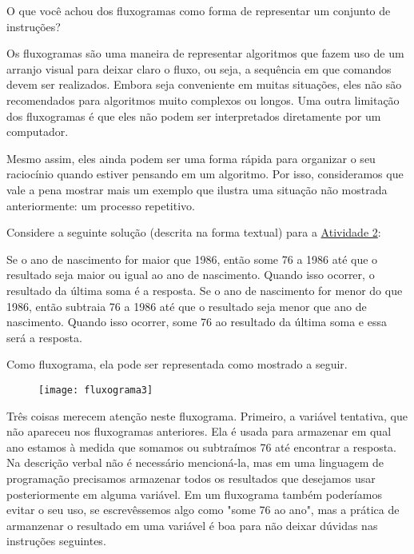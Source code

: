 \begin{reflection}
O que você achou dos fluxogramas como forma de representar um conjunto de instruções?
\end{reflection}

\label{comp-arr2}

Os fluxogramas são uma maneira de representar algoritmos que fazem uso de um arranjo visual para deixar claro o fluxo, ou seja, a sequência em que comandos devem ser realizados. Embora seja conveniente em muitas situações, eles não são recomendados para algoritmos muito complexos ou longos. Uma outra limitação dos fluxogramas é que eles não podem ser interpretados diretamente por um computador.

Mesmo assim, eles ainda podem ser uma forma rápida para organizar o seu raciocínio quando estiver pensando em um algoritmo. Por isso, consideramos que vale a pena mostrar mais um exemplo que ilustra uma situação não mostrada anteriormente: um processo repetitivo.

Considere a seguinte solução (descrita na forma textual) para a \hyperref[comp-task2]{Atividade 2}:

Se o ano de nascimento for maior que 1986, então some 76 a 1986 até que o resultado seja maior ou igual ao ano de nascimento. Quando isso ocorrer, o resultado da última soma é a resposta.
Se o ano de nascimento for menor do que 1986, então subtraia 76 a 1986 até que o resultado seja menor que ano de nascimento. Quando isso ocorrer, some 76 ao resultado da última soma e essa será a resposta.

Como fluxograma, ela pode ser representada como mostrado a seguir.

\begin{figure}[H]
\centering
\texttt{[image: fluxograma3]}
\end{figure}

Três coisas merecem atenção neste fluxograma.
Primeiro, a variável tentativa, que não apareceu nos fluxogramas anteriores. Ela é usada para armazenar em qual ano estamos à medida que somamos ou subtraímos 76 até encontrar a resposta. Na descrição verbal não é necessário mencioná-la, mas em uma linguagem de programação precisamos armazenar todos os resultados que desejamos usar posteriormente em alguma variável. Em um fluxograma também poderíamos evitar o seu uso, se escrevêssemos algo como "some 76 ao ano", mas a prática de armanzenar o resultado em uma variável é boa para não deixar dúvidas nas instruções seguintes.

